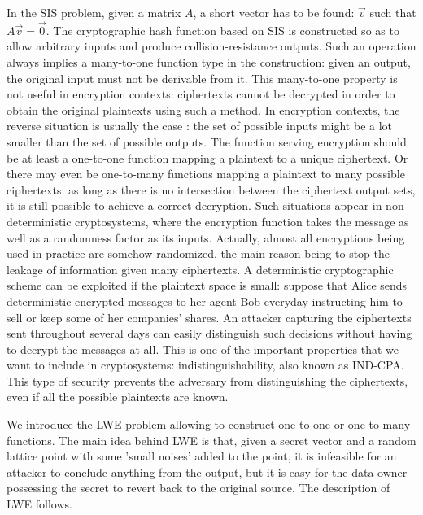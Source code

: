 In the SIS problem, given a matrix $A$, a short vector has to be found:
$\vec{v}$ such that $A\vec{v} = \vec{0}$. The cryptographic hash function 
 based on SIS is constructed so as to allow arbitrary inputs and
produce collision-resistance outputs. Such an operation always implies a
many-to-one function type in the construction: given an output, the original input must not be derivable from it. This many-to-one property is not useful
in encryption contexts: ciphertexts cannot be decrypted in order to obtain the original
plaintexts using such a method. In encryption contexts, the reverse
situation is usually the case : the set of possible inputs might be a lot smaller than the set of
possible outputs. The function serving encryption should be at least a
one-to-one function mapping a plaintext to a unique ciphertext. Or there may even
be one-to-many functions mapping a plaintext to many possible ciphertexts: as
long as there is no intersection between the ciphertext output sets, it is
still possible to achieve a correct decryption. Such situations appear in non-deterministic
cryptosystems, where the encryption function takes the message as well as a
randomness factor as its inputs. Actually, almost all encryptions being used in
practice are somehow randomized, the main reason being to stop the leakage of
information given many ciphertexts. A deterministic cryptographic scheme can be
exploited if the plaintext space is small: suppose that Alice sends deterministic encrypted messages to her agent Bob everyday instructing him to sell or keep some of her companies' shares.  An attacker capturing the ciphertexts sent throughout several days can easily distinguish such decisions without having to decrypt the messages at all. This is one of the important properties that we want to include in cryptosystems: indistinguishability, also known as IND-CPA. This type of security prevents the adversary from distinguishing the ciphertexts, even if all the possible plaintexts are known.

We introduce the LWE problem \cite{regev2005lattices} allowing to construct
one-to-one or one-to-many functions. The main idea behind LWE is that, given a secret
vector and a random lattice point with some 'small noises' added to the point,
it is infeasible for an attacker to conclude anything from the output, but it is
easy for the data owner possessing the secret to revert back to the original source. The
description of LWE follows.

